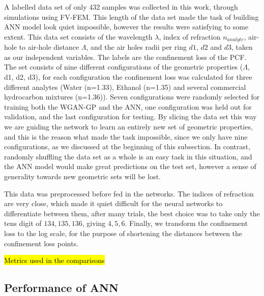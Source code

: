 \documentclass[draft, a4, 10pt, onecolumn]{IEEEtran}
\begin{document}
A labelled data set of only 432 samples was collected in this work, through simulations using FV-FEM. This length of the data set made the task of building ANN model look quiet impossible, however the results were satisfying to some extent. This data set consists of the wavelength $\lambda$, index of refraction $n_{analyte} $, air-hole to air-hole distance $ \Lambda $, and the air holes radii per ring $d1$, $d2$ and $d3$, taken as our independent variables. The labels are the confinement loss of the PCF. The set consists of nine different configurations of the geometric properties ($ \Lambda $, d1, d2, d3), for each configuration the confinement loss was calculated for three different analytes (Water (n=1.33), Ethanol (n=1.35) and several commercial hydrocarbon mixtures (n=1.36)). Seven configurations were randomly selected for training both the WGAN-GP and the ANN, one configuration was held out for validation, and the last configuration for testing. By slicing the data set this way we are guiding the network to learn an entirely new set of geometric properties, and this is the reason what made the task impossible, since we only have nine configurations, as we discussed at the beginning of this subsection. In contrast, randomly shuffling the data set as a whole is an easy task in this situation, and the ANN model would make great predictions on the test set, however a sense of generality towards new geometric sets will be lost.

This data was preprocessed before fed in the networks. The indices of refraction  are very close, which made it quiet difficult for the neural networks to differentiate between them, after many trials, the best choice was to take only the tens digit of ${134, 135, 136}$, giving ${4, 5, 6}$. Finally, we transform the confinement loss to the log scale, for the purpose of shortening the distances between the confinement loss points.

\hl{Metrics used in the comparisons}


\subsection{Performance of ANN}
\end{document}
